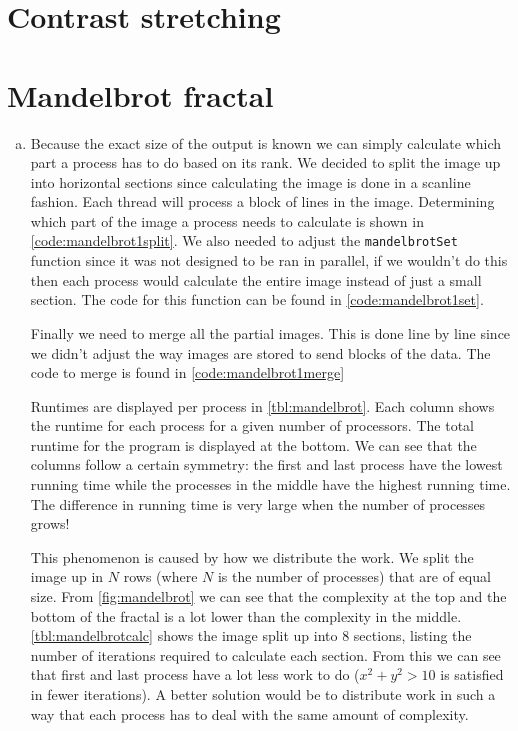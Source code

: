\documentclass[a4paper]{article}
\begin{document}
\section{Contrast stretching}

\section{Mandelbrot fractal}
\begin{enumerate}[(a)]
	\item Because the exact size of the output is known we can simply calculate which part a process has to do based on its rank. We decided to split the image up into horizontal sections since calculating the image is done in a scanline fashion. Each thread will process a block of lines in the image. Determining which part of the image a process needs to calculate is shown in \autoref{code:mandelbrot1split}. We also needed to adjust the \texttt{mandelbrotSet} function since it was not designed to be ran in parallel, if we wouldn't do this then each process would calculate the entire image instead of just a small section. The code for this function can be found in \autoref{code:mandelbrot1set}.
	
	
	
	Finally we need to merge all the partial images. This is done line by line since we didn't adjust the way images are stored to send blocks of the data. The code to merge is found in \autoref{code:mandelbrot1merge}
	
		
	Runtimes are displayed per process in \autoref{tbl:mandelbrot}. Each column shows the runtime for each process for a given number of processors. The total runtime for the program is displayed at the bottom. We can see that the columns follow a certain symmetry: the first and last process have the lowest running time while the processes in the middle have the highest running time. The difference in running time is very large when the number of processes grows!
	
	This phenomenon is caused by how we distribute the work. We split the image up in $N$ rows (where $N$ is the number of processes) that are of equal size. From \autoref{fig:mandelbrot} we can see that the complexity at the top and the bottom of the fractal is a lot lower than the complexity in the middle. \autoref{tbl:mandelbrotcalc} shows the image split up into 8 sections, listing the number of iterations required to calculate each section. From this we can see that first and last process have a lot less work to do ($x^2 + y^2 > 10$ is satisfied in fewer iterations). A better solution would be to distribute work in such a way that each process has to deal with the same amount of complexity.
	

\end{enumerate}
\end{document}
